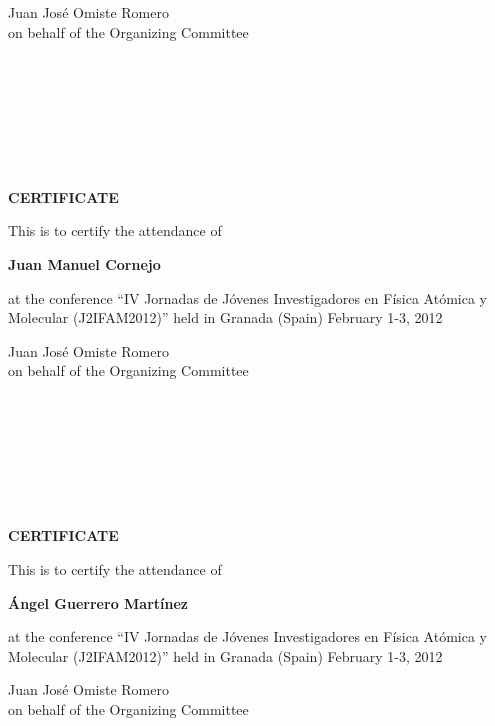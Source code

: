 \documentclass [13pt,a4paper] {letter}
\begin{document}
\vspace {4cm}
\begin{raggedleft}
Juan José Omiste Romero\\
on behalf of the Organizing Committee
\newpage
\end{raggedleft}
\begin{verbatim}







\end{verbatim}
\pagestyle{empty}
\begin{center}
{\bf {\Huge CERTIFICATE}}

\vspace {1.5cm}
This is to certify the attendance of
\vspace {1cm}

{\bf \Large  Juan  Manuel  Cornejo }
\vspace {1cm}

at the conference { \textquotedblleft IV Jornadas de Jóvenes Investigadores en Física Atómica y Molecular (J2IFAM2012)\textquotedblright} 
held in Granada (Spain) February 1-3, 2012
\end{center}
\vspace {4cm}
\begin{raggedleft}
Juan José Omiste Romero\\
on behalf of the Organizing Committee
\newpage
\end{raggedleft}
\begin{verbatim}







\end{verbatim}
\pagestyle{empty}
\begin{center}
{\bf {\Huge CERTIFICATE}}

\vspace {1.5cm}
This is to certify the attendance of
\vspace {1cm}

{\bf \Large  Ángel    Guerrero Martínez }
\vspace {1cm}

at the conference { \textquotedblleft IV Jornadas de Jóvenes Investigadores en Física Atómica y Molecular (J2IFAM2012)\textquotedblright} 
held in Granada (Spain) February 1-3, 2012
\end{center}
\vspace {4cm}
\begin{raggedleft}
Juan José Omiste Romero\\
on behalf of the Organizing Committee
\newpage
\end{raggedleft}
\begin{verbatim}







\end{verbatim}
\end{document}
